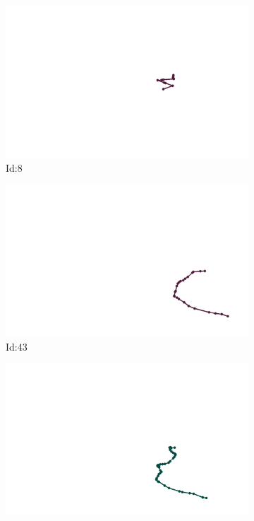 \documentclass[12pt,twoside]{report}
\begin{document}
\begin{figure}
\centering
\begin{subfigure}[b]{0.20\textwidth}
\centering
\includegraphics[width=\textwidth]{../trajectories/8.png}
\caption{Id:8}
\end{subfigure}
\begin{subfigure}[b]{0.20\textwidth}
\centering
\includegraphics[width=\textwidth]{../trajectories/43.png}
\caption{Id:43}
\end{subfigure}
\begin{subfigure}[b]{0.20\textwidth}
\centering
\includegraphics[width=\textwidth]{../trajectories/59.png}

\end{subfigure}
\end{figure}
\end{document}
